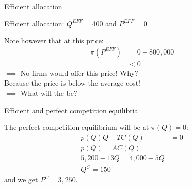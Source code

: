 \begin{frame}{Efficient allocation}

    Efficient allocation: $Q^{EFF}= 400$ and $P^{EFF} = 0$\\
    \vspace{5mm}

    Note however that at this price:
    \begin{align*}
        \pi(P^{EFF}) &= 0 - 800,000\\
        &<0
    \end{align*}
    $\implies$ No firms would offer this price! Why?\\
    \pause
    Because the price is below the average cost!\\
    \pause
    \vspace{3mm}
    $\implies$ What will the  be?

\end{frame}
\begin{frame}{Efficient and perfect competition equilibria}

    The perfect competition equilibrium will be at $\pi(Q) = 0$:
    \begin{align*}
        p(Q)Q - TC(Q) &= 0\\
        p(Q) = AC(Q)\\
        5,200 - 13Q = 4,000 - 5 Q\\
        Q^{C} = 150
    \end{align*}
    and we get $P^{C} = 3,250$.

\end{frame}
